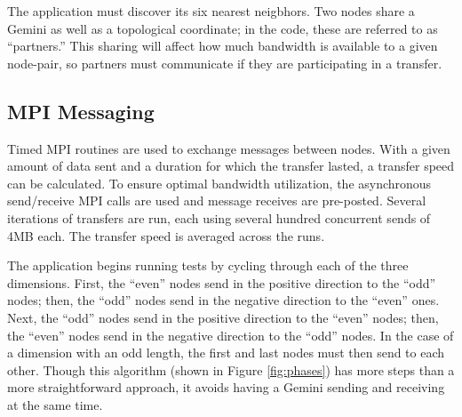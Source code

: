 \documentclass[10pt, conference, compsocconf]{IEEEtran}
\begin{document}
The application must discover its six nearest neigbhors.  Two nodes share a
Gemini as well as a topological coordinate;  in the code, these are referred to
as ``partners.''  This sharing will affect how much bandwidth is available to a
given node-pair, so partners must communicate if they are participating in a
transfer.

\subsection{MPI Messaging}

Timed MPI routines are used to exchange messages between nodes.  With a given
amount of data sent and a duration for which the transfer lasted, a transfer
speed can be calculated.  To ensure optimal bandwidth utilization, the
asynchronous send/receive MPI calls are used and message receives are
pre-posted.  Several iterations of transfers are run, each using several
hundred concurrent sends of 4MB each.  The transfer speed is averaged across
the runs.

The application begins running tests by cycling through each of the three
dimensions.  First, the ``even'' nodes send in the positive direction to the
``odd'' nodes;  then, the ``odd'' nodes send in the negative direction to the
``even'' ones.  Next, the ``odd'' nodes send in the positive direction to the
``even'' nodes; then, the ``even'' nodes send in the negative direction to the
``odd'' nodes.  In the case of a dimension with an odd length, the first and
last nodes must then send to each other.  Though this algorithm (shown in
Figure \ref{fig:phases}) has more steps than a more straightforward approach,
it avoids having a Gemini sending and receiving at the same time.
\end{document}
